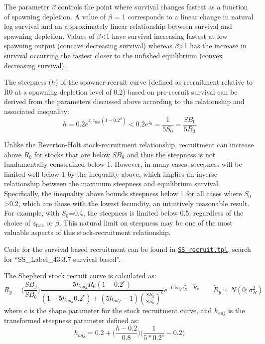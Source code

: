 The parameter $\beta$ controls the point where survival changes fastest as a function of spawning depletion. A value of $\beta$ = 1 corresponds to a linear change in natural log survival and an approximately linear relationship between survival and spawning depletion. Values of $\beta$<1 have survival increasing fastest at low spawning output (concave decreasing survival) whereas $\beta$>1 has the increase in survival occurring the fastest closer to the unfished equilibrium (convex decreasing survival).

The steepness ($h$) of the spawner-recruit curve (defined as recruitment relative to R0 at a spawning depletion level of 0.2) based on pre-recruit survival can be derived from the parameters discussed above according to the relationship and associated inequality:
\begin{equation}
h = 0.2e^{z_0z_{\text{frac}}(1-0.2^\beta)}<0.2e^{z_0}=\frac{1}{5S_0}=\frac{SB_0}{5R_0}
\end{equation}

Unlike the Beverton-Holt stock-recruitment relationship, recruitment can increase above $R_0$ for stocks that are below $SB_0$ and thus the steepness is not fundamentally constrained below 1. However, in many cases, steepness will be limited well below 1 by the inequality above, which implies an inverse relationship between the maximum steepness and equilibrium survival. Specifically, the inequality above bounds steepness below 1 for all cases where $S_0$>0.2, which are those with the lowest fecundity, an intuitively reasonable result. For example, with $S_0$=0.4, the steepness is limited below 0.5, regardless of the choice of $z_{\text{frac}}$ or $\beta$. This natural limit on steepness may be one of the most valuable aspects of this stock-recruitment relationship.

Code for the survival based recruitment can be found in \href{https://github.com/nmfs-ost/ss3-source-code/blob/main/SS_recruit.tpl}{\texttt{SS\_recruit.tpl}}, search for ``SS\_Label\_43.3.7 survival based''.

\hypertarget{Shepherd}{} 
The Shepherd stock recruit curve is calculated as:
\begin{equation}
R_y = \bigg(\frac{SB_y}{SB_0}\bigg)\frac{5h_{adj}R_0(1-0.2^c)}{(1-5h_{adj}0.2^c)+(5h_{adj}-1)(\frac{SB_y}{SB_0})^c}e^{-0.5b_y\sigma^2_R+\tilde{R}_y}\qquad \tilde{R}_y\sim N(0;\sigma^2_R)
\end{equation}
where c is the shape parameter for the stock recruitment curve, and $h_{adj}$ is the transformed steepness parameter defined as:
\begin{equation}
h_{adj}=0.2+\bigg(\frac{h-0.2}{0.8}\bigg)\bigg(\frac{1}{5*0.2^c}-0.2\bigg)
\end{equation}

